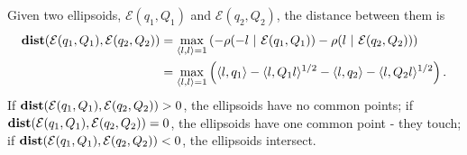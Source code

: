 \documentclass[letterpaper,10pt,english]{sphinxmanual}
\begin{document}
Given two ellipsoids, \({\mathcal E}(q_1,Q_1)\) and
\({\mathcal E}(q_2,Q_2)\), the distance between them is
\label{chap_ellcalc:equation-dist_ell}\begin{gather}
\begin{split}\begin{aligned}
{\bf dist}({\mathcal E}(q_1,Q_1),{\mathcal E}(q_2,Q_2)) & = \max_{\langle l,l\rangle=1}
\left(-\rho(-l ~|~ {\mathcal E}(q_1,Q_1)) - \rho(l ~|~ {\mathcal E}(q_2,Q_2))\right) \\
& = \max_{\langle l,l\rangle=1}\left(\langle l,q_1\rangle -
\langle l,Q_1l\rangle^{1/2} - \langle l,q_2\rangle -
\langle l,Q_2l\rangle^{1/2}\right).
\end{aligned}\end{split}\label{chap_ellcalc-dist_ell}
\end{gather}
If \({\bf dist}({\mathcal E}(q_1,Q_1),{\mathcal E}(q_2,Q_2)) > 0\),
the ellipsoids have no common points; if
\({\bf dist}({\mathcal E}(q_1,Q_1),{\mathcal E}(q_2,Q_2)) = 0\), the
ellipsoids have one common point - they touch; if
\({\bf dist}({\mathcal E}(q_1,Q_1),{\mathcal E}(q_2,Q_2)) < 0\), the
ellipsoids intersect.
\end{document}
